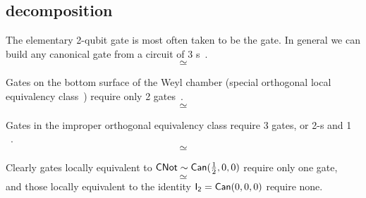 \subsection{ decomposition}
The elementary 2-qubit gate is most often taken to be the  gate. In general we can build any canonical gate from a circuit of 3 s~\cite{Vidal2003a, Vatan2003a, Vatan2004a}.
$$

\simeq

$$

Gates on the bottom surface of the Weyl chamber (special orthogonal local equivalency class~) require only 2  gates~\cite{Vidal2003a,Vatan2004a, self}.
$$

\simeq

$$

Gates in the improper orthogonal equivalency class  require 3  gates, or 2-s and 1 ~\cite{Vatan2004a}.
$$

\simeq

$$

Clearly gates locally equivalent to $\Gate{CNot}\loceq\Gate{Can}(\half, 0,0)$ require only one  gate, 
$$

\simeq

$$
and those locally equivalent to the identity $\Gate{I_2}=\Gate{Can}(0, 0,0)$ require none. 

